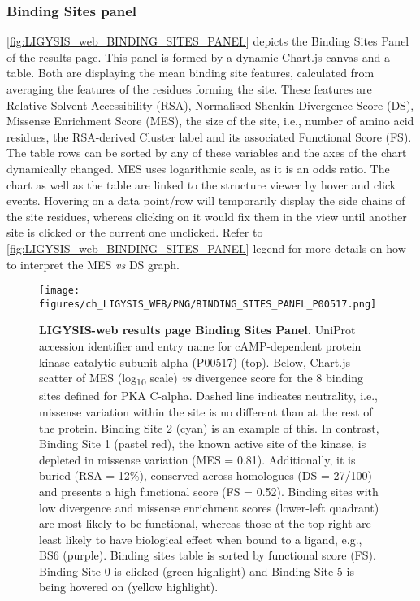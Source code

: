 \subsubsection{Binding Sites panel}

\autoref{fig:LIGYSIS_web_BINDING_SITES_PANEL} depicts the Binding Sites Panel of the results page. This panel is formed by a dynamic Chart.js canvas and a table. Both are displaying the mean binding site features, calculated from averaging the features of the residues forming the site. These features are Relative Solvent Accessibility (RSA), Normalised Shenkin Divergence Score (DS), Missense Enrichment Score (MES), the size of the site, i.e., number of amino acid residues, the RSA-derived Cluster label and its associated Functional Score (FS). The table rows can be sorted by any of these variables and the axes of the chart dynamically changed. MES uses logarithmic scale, as it is an odds ratio. The chart as well as the table are linked to the structure viewer by hover and click events. Hovering on a data point/row will temporarily display the side chains of the site residues, whereas clicking on it would fix them in the view until another site is clicked or the current one unclicked. Refer to \autoref{fig:LIGYSIS_web_BINDING_SITES_PANEL} legend for more details on how to interpret the MES \textit{vs} DS graph.

\begin{figure}[htb!]
    \centering
    \texttt{[image: figures/ch\_LIGYSIS\_WEB/PNG/BINDING\_SITES\_PANEL\_P00517.png]}
    \caption[LIGYSIS-web results page Binding Sites Panel]{\textbf{LIGYSIS-web results page Binding Sites Panel.} UniProt accession identifier and entry name for cAMP-dependent protein kinase catalytic subunit alpha (\href{https://www.uniprot.org/uniprotkb/P00517/entry}{P00517}) (top). Below, Chart.js scatter of MES (log\textsubscript{10} scale) \textit{vs} divergence score for the 8 binding sites defined for PKA C-alpha. Dashed line indicates neutrality, i.e., missense variation within the site is no different than at the rest of the protein. Binding Site 2 (cyan) is an example of this. In contrast, Binding Site 1 (pastel red), the known active site of the kinase, is depleted in missense variation (MES = 0.81). Additionally, it is buried (RSA = 12\%), conserved across homologues (DS = 27/100) and presents a high functional score (FS = 0.52). Binding sites with low divergence and missense enrichment scores (lower-left quadrant) are most likely to be functional, whereas those at the top-right are least likely to have biological effect when bound to a ligand, e.g., BS6 (purple). Binding sites table is sorted by functional score (FS). Binding Site 0 is clicked (green highlight) and Binding Site 5 is being hovered on (yellow highlight).}
    \label{fig:LIGYSIS_web_BINDING_SITES_PANEL}
\end{figure}

